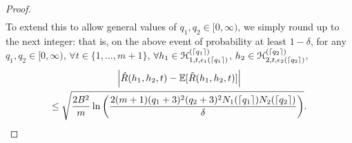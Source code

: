 \documentclass{article}
\begin{document}
\begin{proof}
\begin{multline*}
\end{multline*}
To extend this to allow general values of $q_{1},q_{2} \in [0,\infty)$, we simply round up to the next integer:
that is, on the above event of probability at least $1-\delta$, 
for any $q_{1},q_{2} \in [0,\infty)$, 
$\forall t \in \{1,\ldots,m+1\}$,
$\forall h_{1} \in \mathcal H_{1,t,\epsilon_{1}(\lceil q_{1} \rceil)}^{(\lceil q_{1} \rceil)}$, $h_{2} \in \mathcal H_{2,t,\epsilon_{2}(\lceil q_{2} \rceil)}^{(\lceil q_{2} \rceil)}$,
\begin{multline*}
\left| \hat{R}(h_{1},h_{2},t) - \mathbb{E}[\tilde{R}(h_{1},h_{2},t)] \right| 
\\ \leq \sqrt{\frac{2B^{2}}{m}\ln\left(\frac{2 (m+1) (q_{1}+3)^{2} (q_{2}+3)^{2} N_{1}(\lceil q_{1} \rceil) N_{2}(\lceil q_{2} \rceil)}{\delta}\right)}.
\end{multline*}


\end{proof}
\end{document}
